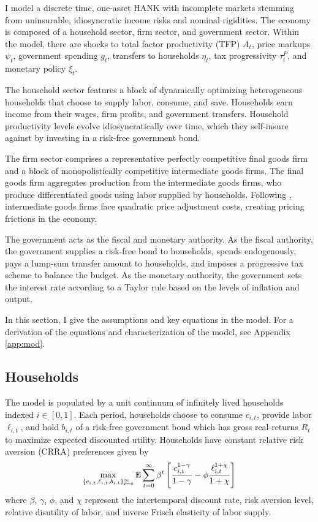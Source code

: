 I model a discrete time, one-asset HANK with incomplete markets stemming from uninsurable, idiosyncratic income risks and nominal rigidities. The economy is composed of a household sector, firm sector, and government sector. Within the model, there are shocks to total factor productivity (TFP) $A_t$, price markups $\psi_t$, government spending $g_t$, transfers to households $\eta_t$, tax progressivity $\tau^P_t$, and monetary policy $\xi_t$.


The household sector features a block of dynamically optimizing heterogeneous households that choose to supply labor, consume, and save. Households earn income from their wages, firm profits, and government transfers. Household productivity levels evolve idiosyncratically over time, which they self-insure against by investing in a risk-free government bond.

The firm sector comprises a representative perfectly competitive final goods firm and a block of monopolistically competitive intermediate goods firms. The final goods firm aggregates production from the intermediate goods firms, who produce differentiated goods using labor supplied by households. Following \textcite{rotemberg1982sticky}, intermediate goods firms face quadratic price adjustment costs, creating pricing frictions in the economy.

The government acts as the fiscal and monetary authority. As the fiscal authority, the government supplies a risk-free bond to households, spends endogenously, pays a lump-sum transfer amount to households, and imposes a progressive tax scheme to balance the budget. As the monetary authority, the government sets the interest rate according to a Taylor rule based on the levels of inflation and output.

In this section, I give the assumptions and key equations in the model. For a derivation of the equations and characterization of the model, see Appendix \ref{app:mod}.


\subsection{Households} \label{subsec:hh}

The model is populated by a unit continuum of infinitely lived households indexed $i \in [0, 1]$. Each period, households choose to consume $c_{i, t}$, provide labor $\ell_{i, t}$, and hold $b_{i, t}$ of a risk-free government bond which has gross real returns $R_t$ to maximize expected discounted utility. Households have constant relative risk aversion (CRRA) preferences given by 
\begin{equation*}
    \max_{\{c_{i,t}, \ell_{i, t}, b_{i, t}\}_{t=0}^\infty} \mathbb{E} \sum_{t = 0}^\infty \beta^t \left[ \frac{c_{i, t}^{1 - \gamma}}{1 - \gamma} - \phi \frac{\ell_{i, t}^{1 + \chi}}{1 + \chi} \right]
\end{equation*}
where $\beta$, $\gamma$, $\phi$, and $\chi$ represent the intertemporal discount rate, risk aversion level, relative disutility of labor, and inverse Frisch elasticity of labor supply.

